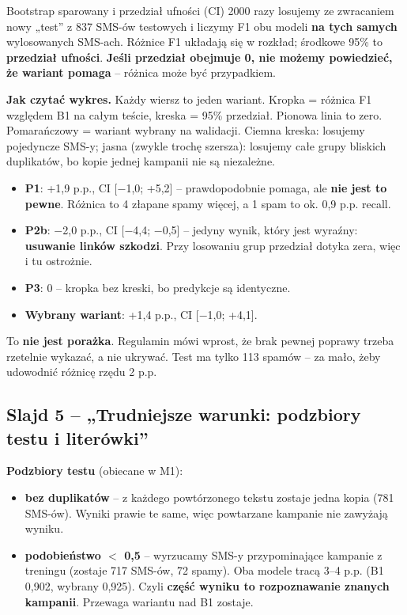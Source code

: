 \documentclass[11pt,a4paper]{article}
\begin{document}
\begin{pojecie}{Bootstrap sparowany i przedział ufności (CI)}
2000 razy losujemy ze zwracaniem nowy „test” z 837 SMS-ów testowych i liczymy F1 obu modeli \textbf{na tych samych}
wylosowanych SMS-ach. Różnice F1 układają się w rozkład; środkowe 95\% to \textbf{przedział ufności}.
\textbf{Jeśli przedział obejmuje 0, nie możemy powiedzieć, że wariant pomaga} -- różnica może być przypadkiem.
\end{pojecie}

\textbf{Jak czytać wykres.} Każdy wiersz to jeden wariant. Kropka = różnica F1 względem B1 na całym teście, kreska = 95\%
przedział. Pionowa linia to zero. Pomarańczowy = wariant wybrany na walidacji. Ciemna kreska: losujemy pojedyncze SMS-y;
jasna (zwykle trochę szersza): losujemy całe grupy bliskich duplikatów, bo kopie jednej kampanii nie są niezależne.

\begin{itemize}
  \item \textbf{P1}: +1,9 p.p., CI [$-$1,0; +5,2] -- prawdopodobnie pomaga, ale \textbf{nie jest to pewne}. Różnica to
        4 złapane spamy więcej, a 1 spam to ok. 0,9 p.p. recall.
  \item \textbf{P2b}: $-$2,0 p.p., CI [$-$4,4; $-$0,5] -- jedyny wynik, który jest wyraźny: \textbf{usuwanie linków szkodzi}.
        Przy losowaniu grup przedział dotyka zera, więc i tu ostrożnie.
  \item \textbf{P3}: 0 -- kropka bez kreski, bo predykcje są identyczne.
  \item \textbf{Wybrany wariant}: +1,4 p.p., CI [$-$1,0; +4,1].
\end{itemize}

To \textbf{nie jest porażka}. Regulamin mówi wprost, że brak pewnej poprawy trzeba rzetelnie wykazać, a nie ukrywać.
Test ma tylko 113 spamów -- za mało, żeby udowodnić różnicę rzędu 2 p.p.

\subsection{Slajd 5 -- „Trudniejsze warunki: podzbiory testu i literówki”}

\textbf{Podzbiory testu} (obiecane w M1):
\begin{itemize}
  \item \textbf{bez duplikatów} -- z każdego powtórzonego tekstu zostaje jedna kopia (781 SMS-ów). Wyniki prawie te same,
        więc powtarzane kampanie nie zawyżają wyniku.
  \item \textbf{podobieństwo $<$ 0,5} -- wyrzucamy SMS-y przypominające kampanie z treningu (zostaje 717 SMS-ów, 72 spamy).
        Oba modele tracą 3--4 p.p. (B1 0,902, wybrany 0,925). Czyli \textbf{część wyniku to rozpoznawanie znanych kampanii}.
        Przewaga wariantu nad B1 zostaje.
\end{itemize}
\end{document}
